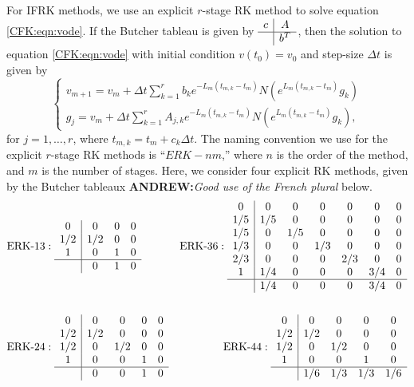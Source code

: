 \documentclass{csri19}
\newcommand{\A}[1]{\textbf{ANDREW:}\textit{#1}}
\begin{document}
For IFRK methods, we use an explicit $r$-stage RK method to solve 
equation \ref{CFK:eqn:vode}. If the Butcher tableau is given by 
$\begin{array}{c|c}
c & A \\ \hline & b^T \end{array}$, then the solution to equation \ref{CFK:eqn:vode} 
with initial condition $v(t_0) = v_0$ and step-size $\Delta t$ is given by
\[ \left\{\begin{array}{l} v_{m+1} = v_m + \Delta t\sum_{k=1}^r b_k 
                         e^{-L_m(t_{m,k}-t_m)}N(e^{L_m(t_{m,k}-t_m)}g_k) \\
          g_j = v_m + \Delta t \sum_{k=1}^r A_{j,k} e^{-L_m(t_{m,k} - t_m)} 
                      N(e^{L_m(t_{m,k}-t_m)}g_k), \end{array} \right. \]
for $j = 1,\dots,r$, where $t_{m,k} = t_m + c_k \Delta t$.
The naming convention we use for the explicit $r$-stage RK methods is ``$ERK
-nm$,'' where $n$ is the order of the method, and $m$ is the number of
stages. Here, we consider four explicit RK methods, given by the Butcher 
tableaux \A{Good use of the French plural} below.
\begin{align*}&\text{ERK-}13:
 \begin{array}{c|ccc}
0   & 0   & 0 & 0\\
1/2 & 1/2 & 0 & 0\\
1   & 0   & 1 & 0\\
\hline
    & 0   & 1 & 0
\end{array}
& \text{ERK-}36: 
\begin{array}{c|cccccc}
0   & 0   & 0   & 0   & 0   & 0   & 0\\
1/5 & 1/5 & 0   & 0   & 0   & 0   & 0\\
1/5 & 0   & 1/5 & 0   & 0   & 0   & 0\\
1/3 & 0   & 0   & 1/3 & 0   & 0   & 0\\
2/3 & 0   & 0   & 0   & 2/3 & 0   & 0\\
1   & 1/4 & 0   & 0   & 0   & 3/4 & 0\\
\hline
    & 1/4 & 0   & 0   & 0   & 3/4 & 0
\end{array}\\
\\
&\text{ERK-}24: 
\begin{array}{c|cccc}
0   & 0   & 0   & 0 & 0\\
1/2 & 1/2 & 0   & 0 & 0\\
1/2 & 0   & 1/2 & 0 & 0\\
1   & 0   & 0   & 1 & 0\\
\hline
    & 0   & 0   & 1 & 0
\end{array}
& \text{ERK-}44: 
\begin{array}{c|cccc}
0   & 0   & 0   & 0   & 0 \\
1/2 & 1/2 & 0   & 0   & 0 \\
1/2 & 0   & 1/2 & 0   & 0 \\
1   & 0   & 0   & 1   & 0 \\
\hline
    & 1/6 & 1/3 & 1/3 & 1/6
\end{array} 
\end{align*}
\end{document}

